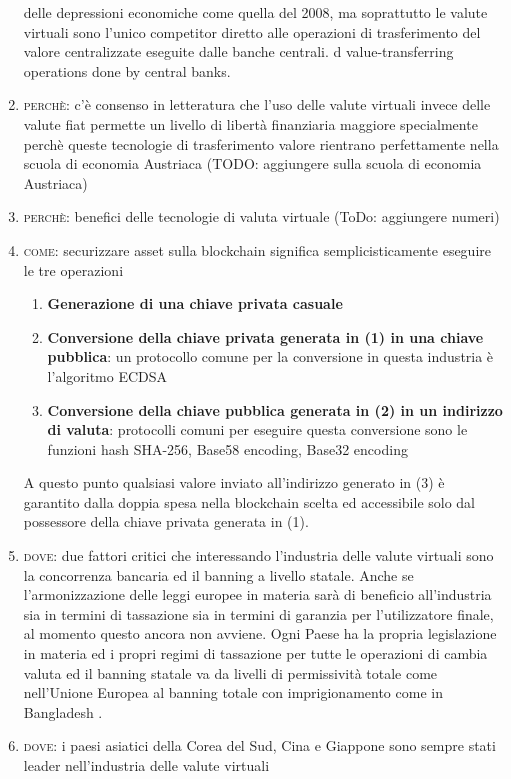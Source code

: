 \documentclass[11pt,fleqn,oneside]{book} %
\begin{document}
\begin{enumerate}
	delle depressioni economiche come quella del 2008, ma soprattutto le valute virtuali sono l'unico competitor diretto alle operazioni
	di trasferimento del valore centralizzate eseguite dalle banche centrali. d value-transferring operations done by central banks.
	\item \textsc{perchè}: c'è consenso in letteratura che l'uso delle valute virtuali invece delle valute fiat permette un livello di
	libertà finanziaria maggiore specialmente perchè queste tecnologie di trasferimento valore rientrano perfettamente nella scuola
	di economia Austriaca \cite{austrianTheory} (TODO: aggiungere sulla scuola di economia Austriaca)
	\item \textsc{perchè}: benefici delle tecnologie di valuta virtuale (ToDo: aggiungere numeri)
	\item \textsc{come}: securizzare asset sulla blockchain significa semplicisticamente eseguire le tre operazioni
		\begin{enumerate}[label*=\arabic*.]
			\item \textbf{Generazione di una chiave privata casuale}
			\item \textbf{Conversione della chiave privata generata in (1) in una chiave pubblica}: un protocollo comune per la conversione
			in questa industria è l'algoritmo ECDSA
			\item \textbf{Conversione della chiave pubblica generata in (2) in un indirizzo di valuta}: protocolli comuni per eseguire questa
			conversione sono le funzioni hash SHA-256, Base58 encoding, Base32 encoding
		\end{enumerate}
	A questo punto qualsiasi valore inviato all'indirizzo generato in (3) è garantito dalla doppia spesa nella blockchain scelta ed accessibile
	solo dal possessore della chiave privata generata in (1).
	\item \textsc{dove}: due fattori critici che interessando l'industria delle valute virtuali sono la concorrenza bancaria ed il 
	banning a livello statale. Anche se l'armonizzazione delle leggi europee in materia sarà di beneficio all'industria sia in termini di 
	tassazione sia in termini di garanzia per l'utilizzatore finale, al momento questo ancora non avviene. Ogni Paese ha la propria
	legislazione in materia ed i propri regimi di tassazione per tutte le operazioni di cambia valuta ed il banning statale va da livelli
	di permissività totale come nell'Unione Europea al banning totale con imprigionamento come in Bangladesh \cite{bitcoinLegality}. 
	\item \textsc{dove}: i paesi asiatici della Corea del Sud, Cina e Giappone sono sempre stati leader nell'industria delle valute virtuali

\end{enumerate}
\end{document}
